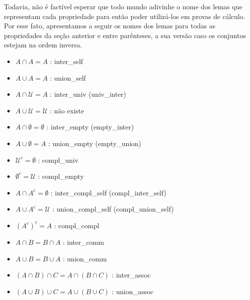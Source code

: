 Todavia, não é factível esperar que todo mundo adivinhe o nome dos lemas que representam cada propriedade para então poder utilizá-los em provas de cálculo. Por esse fato, apresentamos a seguir os nomes dos lemas para todas as propriedades da seção anterior e entre parênteses, a sua versão caso os conjuntos estejam na ordem inversa.

\begin{itemize}
\item $A \cap A = A$ : {\selectfont inter\_self}
\item $A \cup A = A$ : {\selectfont union\_self}
\item $A \cap \mathcal U = A$ : {\selectfont inter\_univ} ({\selectfont univ\_inter})
\item $A \cup \mathcal U = \mathcal U$ : não existe
\item $A \cap \emptyset = \emptyset$ : {\selectfont inter\_empty} ({\selectfont empty\_inter})
\item $A \cup \emptyset = A$ : {\selectfont union\_empty} ({\selectfont empty\_union})
\item $\mathcal U ^c = \emptyset$ : {\selectfont compl\_univ}
\item $\emptyset ^c = \mathcal U$ : {\selectfont compl\_empty}
\item $A \cap A^c = \emptyset$ : {\selectfont inter\_compl\_self} ({\selectfont compl\_inter\_self})
\item $A \cup A^c = \mathcal U$ : {\selectfont union\_compl\_self} ({\selectfont compl\_union\_self})
\item $(A^c)^c = A$ : {\selectfont compl\_compl}
\item $A \cap B = B \cap A$ : {\selectfont inter\_comm}
\item $A \cup B = B \cup A$ : {\selectfont union\_comm}
\item $(A \cap B) \cap C = A \cap (B \cap C)$ : {\selectfont inter\_assoc}
\item $(A \cup B) \cup C = A \cup (B \cup C)$ : {\selectfont union\_assoc}

\end{itemize}
